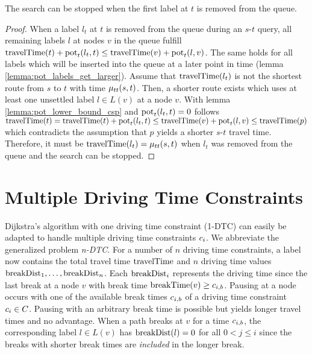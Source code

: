 \begin{theorem}\label{theorem:pot_stop_criterion}
	The search can be stopped when the first label at $t$ is removed from the queue.
\end{theorem}

\begin{proof}
	When a label $l_t$ at $t$ is removed from the queue during an $s$-$t$ query, all remaining labels $l$ at nodes $v$ in the queue fulfill $\operatorname{travelTime}(t) + \operatorname{pot}_t(l_t,t) \le \operatorname{travelTime}(v) + \operatorname{pot}_t(l,v)$. The same holds for all labels which will be inserted into the queue at a later point in time (lemma \ref{lemma:pot_labels_get_larger}). Assume that $\operatorname{travelTime}(l_t)$ is not the shortest route from $s$ to $t$ with time $\mu_{tt}(s,t)$. Then, a shorter route exists which uses at least one unsettled label $l \in L(v)$ at a node $v$. With lemma \ref{lemma:pot_lower_bound_csp} and $\operatorname{pot}_t(l_t,t) = 0$ follows $\operatorname{travelTime}(t) = \operatorname{travelTime}(t) + \operatorname{pot}_t(l_t,t) \le \operatorname{travelTime}(v) + \operatorname{pot}_t(l,v) \le \operatorname{travelTime}(p)$ which contradicts the assumption that $p$ yields a shorter $s$-$t$ travel time. Therefore, it must be $\operatorname{travelTime}(l_t) = \mu_{tt}(s,t)$ when $l_t$ was removed from the queue and the search can be stopped.
\end{proof}

\section{Multiple Driving Time Constraints}
Dijkstra's algorithm with one driving time constraint (1-DTC) can easily be adapted to handle multiple driving time constraints $c_i$. We abbreviate the generalized problem \emph{n-DTC}. For a number of $n$ driving time constraints, a label now contains the total travel time $\operatorname{travelTime}$ and $n$ driving time values $\operatorname{breakDist}_1, \ldots , \operatorname{breakDist}_n$. Each $\operatorname{breakDist}_i$ represents the driving time since the last break at a node $v$ with break time $\operatorname{breakTime}(v) \ge c_{i,b}$. Pausing at a node occurs with one of the available break times $c_{i,b}$ of a driving time constraint $c_i \in C$. Pausing with an arbitrary break time is possible but yields longer travel times and no advantage. When a path breaks at $v$ for a time $c_{i,b}$, the corresponding label $l \in L(v)$ has $\operatorname{breakDist}(l) = 0$ for all $0 < j \le i$ since the breaks with shorter break times are \emph{included} in the longer break.

